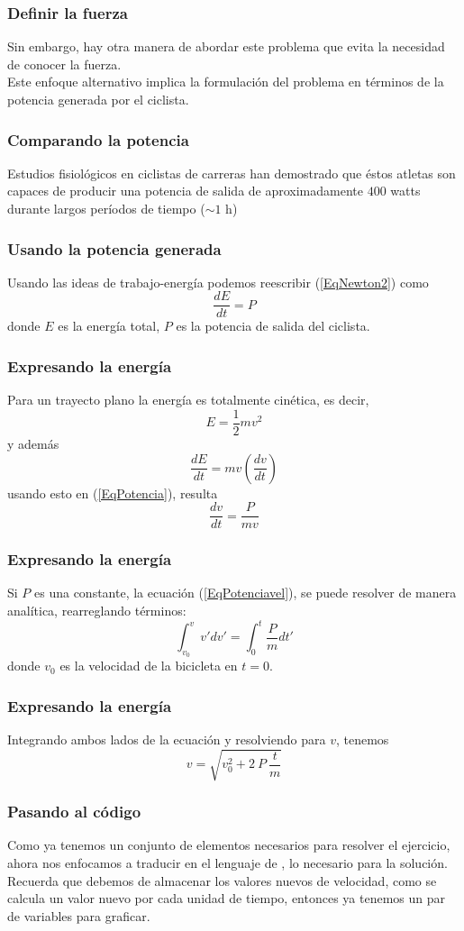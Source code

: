 \begin{frame}
\frametitle{Definir la fuerza}
Sin embargo, hay otra manera de abordar este problema que evita la necesidad de conocer la fuerza.
\\
\medskip
Este enfoque alternativo implica la formulación del problema en términos de la potencia generada por el ciclista.
\end{frame}
\begin{frame}
\frametitle{Comparando la potencia}
Estudios fisiológicos en ciclistas de carreras han demostrado que éstos atletas son capaces de producir una potencia de salida de aproximadamente $400$ watts durante largos períodos de tiempo ($\sim 1$ h)
\end{frame}
\begin{frame}
\frametitle{Usando la potencia generada}
Usando las ideas de trabajo-energía podemos reescribir (\ref{EqNewton2}) como
\begin{equation}\label{EqPotencia}
\dfrac{dE}{dt} = P
\end{equation}
donde $E$ es la energía total, $P$ es la potencia de salida del ciclista. 
\end{frame}
\begin{frame}
\frametitle{Expresando la energía}
Para un trayecto plano la energía es totalmente cinética, es decir,
\[ E = \frac{1}{2} m v^{2} \]
y además
\[ \frac{dE}{dt} = mv (\frac{dv}{dt}) \]
\pause
usando esto en (\ref{EqPotencia}), resulta
\begin{equation}\label{EqPotenciavel}
\dfrac{dv}{dt} = \dfrac{P}{mv}
\end{equation}
\end{frame}
\begin{frame}
\frametitle{Expresando la energía}
Si $P$ es una constante, la ecuación (\ref{EqPotenciavel}), se puede resolver de manera analítica, rearreglando términos:
\begin{equation}\label{EqIntegral}
\int_{v_{0}}^{v} v' dv' = \int_{0}^{t} \dfrac{P}{m} dt'
\end{equation}
donde $v_{0}$ es la velocidad de la bicicleta en $t=0$. 
\end{frame}
\begin{frame}
\frametitle{Expresando la energía}
Integrando ambos lados de la ecuación y resolviendo para $v$, tenemos
\begin{equation}\label{Eqvres}
v = \sqrt{v_{0}^{2} + 2 \: P \: \dfrac{t}{m}}
\end{equation}
\end{frame}
\begin{frame}
\frametitle{Pasando al código}
Como ya tenemos un conjunto de elementos necesarios para resolver el ejercicio, ahora nos enfocamos a traducir en el lenguaje de \python, lo necesario para la solución.
\\
\bigskip
Recuerda que debemos de almacenar los valores nuevos de velocidad, como se calcula un valor nuevo por cada unidad de tiempo, entonces ya tenemos un par de variables para graficar.
\end{frame}
